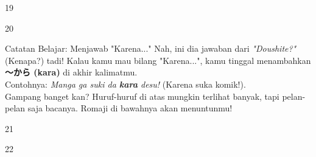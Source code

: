 \begin{convobox}{19}
    \noindent
      

    \vspace{1.5em}
\end{convobox}

\begin{convobox}{20}
    \noindent
      
      

    \vspace{1.5em}
\end{convobox}

\begin{lessonbox}{Catatan Belajar: Menjawab "Karena..."}
    Nah, ini dia jawaban dari \textit{"Doushite?"} (Kenapa?) tadi! Kalau kamu mau bilang "Karena...", kamu tinggal menambahkan \textbf{〜から (kara)} di akhir kalimatmu. \\
    
    Contohnya: \textit{Manga ga suki da \textbf{kara} desu!} (Karena suka komik!). \\
    Gampang banget kan? Huruf-huruf di atas mungkin terlihat banyak, tapi pelan-pelan saja bacanya. Romaji di bawahnya akan menuntunmu!
\end{lessonbox}

\begin{convobox}{21}
    \noindent
      

    \vspace{1.5em}
\end{convobox}

\begin{convobox}{22}
    \noindent
      
      

    \vspace{1.5em}
\end{convobox}

